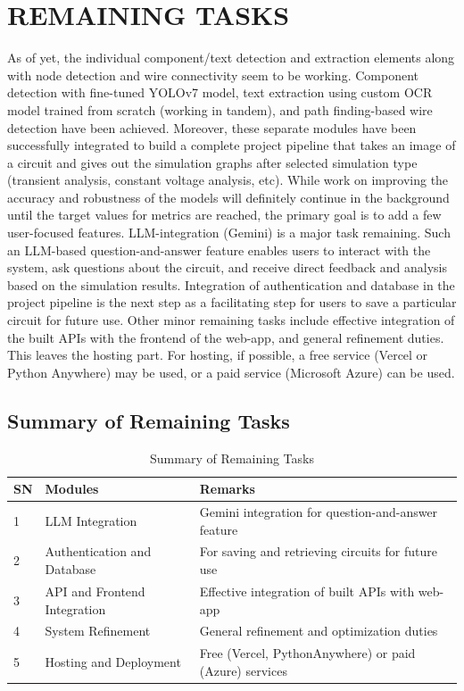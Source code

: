 \chapter{REMAINING TASKS}

As of yet, the individual component/text detection and extraction elements along with node detection and wire connectivity seem to be working. Component detection with fine-tuned YOLOv7 model, text extraction using custom OCR model trained from scratch (working in tandem), and path finding-based wire detection have been achieved. Moreover, these separate modules have been successfully integrated to build a complete project pipeline that takes an image of a circuit and gives out the simulation graphs after selected simulation type (transient analysis, constant voltage analysis, etc). While work on improving the accuracy and robustness of the models will definitely continue in the background until the target values for metrics are reached, the primary goal is to add a few user-focused features. LLM-integration (Gemini) is a major task remaining. Such an LLM-based question-and-answer feature enables users to interact with the system, ask questions about the circuit, and receive direct feedback and analysis based on the simulation results. Integration of authentication and database in the project pipeline is the next step as a facilitating step for users to save a particular circuit for future use. Other minor remaining tasks include effective integration of the built APIs with the frontend of the web-app, and general refinement duties. This leaves the hosting part. For hosting, if possible, a free service (Vercel or Python Anywhere) may be used, or a paid service (Microsoft Azure) can be used.

\section{Summary of Remaining Tasks}

\begin{table}[H]
    \centering
    \small
    \caption{Summary of Remaining Tasks}
    \begin{tabular}{lll}
        \toprule
        \textbf{SN} & \textbf{Modules} & \textbf{Remarks} \\
        \midrule
        1 & LLM Integration & Gemini integration for question-and-answer feature \\
        2 & Authentication and Database & For saving and retrieving circuits for future use \\
        3 & API and Frontend Integration & Effective integration of built APIs with web-app \\
        4 & System Refinement & General refinement and optimization duties \\
        5 & Hosting and Deployment & Free (Vercel, PythonAnywhere) or paid (Azure) services \\
        \bottomrule
    \end{tabular}
    \label{tab:remaining-tasks-summary}
\end{table}


